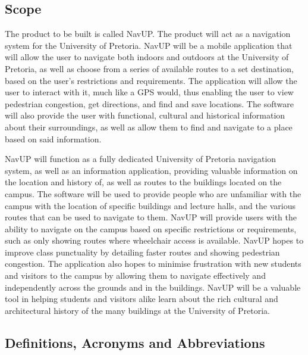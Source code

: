 \documentclass[12pt]{article}
\begin{document}
	\subsection{Scope}

	The product to be built is called NavUP. The product will act as a navigation system for the University of Pretoria. NavUP will be a mobile application that will allow the user to navigate both indoors and outdoors at the University of Pretoria, as well as choose from a series of available routes to a set destination, based on the user’s restrictions and requirements. The application will allow the user to interact with it, much like a GPS would, thus enabling the user to view pedestrian congestion, get directions, and find and save locations. The software will also provide the user with functional, cultural and historical information about their surroundings, as well as allow them to find and navigate to a place based on said information.
\vspace{\baselineskip}

NavUP will function as a fully dedicated University of Pretoria navigation system, as well as an information application, providing valuable information on the location and history of, as well as routes to the buildings located on the campus. The software will be used to provide people who are unfamiliar with the campus with the location of specific buildings and lecture halls, and the various routes that can be used to navigate to them. NavUP will provide users with the ability to navigate on the campus based on specific restrictions or requirements, such as only showing routes where wheelchair access is available. NavUP hopes to improve class punctuality by detailing faster routes and showing pedestrian congestion. The application also hopes to minimise frustration with new students and visitors to the campus by allowing them to navigate effectively and independently across the grounds and in the buildings. NavUP will be a valuable tool in helping students and visitors alike learn about the rich cultural and architectural history of the many buildings at the University of Pretoria.

	\subsection{Definitions, Acronyms and Abbreviations}
\end{document}

